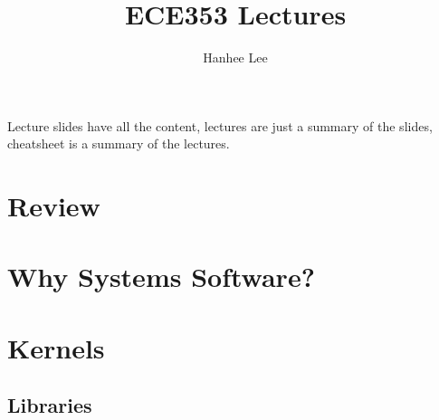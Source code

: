 \documentclass{article}
\title{ECE353 Lectures}
\author{Hanhee Lee}
\begin{document}
\maketitle

\tableofcontents

\begin{summary}
    Lecture slides have all the content, lectures are just a summary of the slides, cheatsheet is a summary of the lectures.
\end{summary}
\newpage

\section{Review}


\newpage

\section{Why Systems Software?}


\newpage

\section{Kernels} 


\newpage

\begin{center}
    \section{Libraries}
\end{center}


\end{document}
